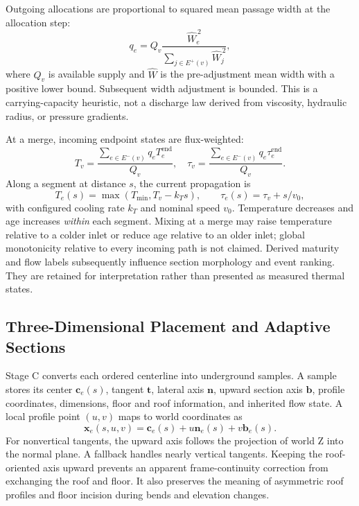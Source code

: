 \documentclass[conference]{IEEEtran}
\begin{document}
Outgoing allocations are proportional to squared mean passage width at the allocation step:
\begin{equation}
q_e=Q_v\frac{\widehat{W}_e^{\,2}}
{\sum_{j\in E^+(v)}\widehat{W}_j^{\,2}},
\label{eq:allocation}
\end{equation}
where $Q_v$ is available supply and $\widehat{W}$ is the pre-adjustment mean width with a positive lower bound. Subsequent width adjustment is bounded. This is a carrying-capacity heuristic, not a discharge law derived from viscosity, hydraulic radius, or pressure gradients.

At a merge, incoming endpoint states are flux-weighted:
\begin{equation}
T_v=\frac{\sum_{e\in E^-(v)}q_eT_e^{\mathrm{end}}}{Q_v},
\quad
\tau_v=\frac{\sum_{e\in E^-(v)}q_e\tau_e^{\mathrm{end}}}{Q_v}.
\label{eq:mixing}
\end{equation}
Along a segment at distance $s$, the current propagation is
\begin{equation}
T_e(s)=\max(T_{\min},T_v-k_Ts),\qquad
\tau_e(s)=\tau_v+s/v_0,
\label{eq:cooling}
\end{equation}
with configured cooling rate $k_T$ and nominal speed $v_0$. Temperature decreases and age increases \emph{within} each segment. Mixing at a merge may raise temperature relative to a colder inlet or reduce age relative to an older inlet; global monotonicity relative to every incoming path is not claimed. Derived maturity and flow labels subsequently influence section morphology and event ranking. They are retained for interpretation rather than presented as measured thermal states.

\subsection{Three-Dimensional Placement and Adaptive Sections}
Stage C converts each ordered centerline into underground samples. A sample stores its center $\mathbf{c}_e(s)$, tangent $\mathbf{t}$, lateral axis $\mathbf{n}$, upward section axis $\mathbf{b}$, profile coordinates, dimensions, floor and roof information, and inherited flow state. A local profile point $(u,v)$ maps to world coordinates as
\begin{equation}
\mathbf{x}_e(s,u,v)=\mathbf{c}_e(s)+u\mathbf{n}_e(s)+v\mathbf{b}_e(s).
\label{eq:frame}
\end{equation}
For nonvertical tangents, the upward axis follows the projection of world Z into the normal plane. A fallback handles nearly vertical tangents. Keeping the roof-oriented axis upward prevents an apparent frame-continuity correction from exchanging the roof and floor. It also preserves the meaning of asymmetric roof profiles and floor incision during bends and elevation changes.
\end{document}
